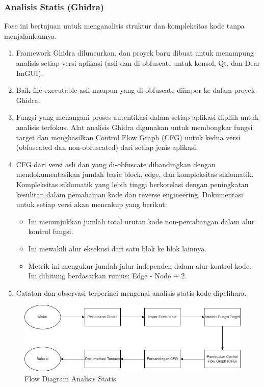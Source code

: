 \subsubsection{Analisis Statis (Ghidra)}
Fase ini bertujuan untuk menganalisis struktur dan kompleksitas kode tanpa menjalankannya.
\begin{enumerate}
	\item {} Framework Ghidra diluncurkan, dan proyek baru dibuat untuk menampung analisis setiap versi aplikasi (asli dan di-obfuscate untuk konsol, Qt, dan Dear ImGUI).
	\item {} Baik file executable asli maupun yang di-obfuscate diimpor ke dalam proyek Ghidra.
	\item {} Fungsi yang menangani proses autentikasi dalam setiap aplikasi dipilih untuk analisis terfokus. Alat analisis Ghidra digunakan untuk membongkar fungsi target dan menghasilkan Control Flow Graph (CFG) untuk kedua versi (obfuscated dan non-obfuscated) dari setiap jenis aplikasi.
	\item {} CFG dari versi asli dan yang di-obfuscate dibandingkan dengan mendokumentasikan jumlah basic block, edge, dan kompleksitas siklomatik. Kompleksitas siklomatik yang lebih tinggi berkorelasi dengan peningkatan kesulitan dalam pemahaman kode dan reverse engineering. Dokumentasi untuk setiap versi akan mencakup yang berikut:
	      \begin{itemize}
		      \item {} Ini menunjukkan jumlah total urutan kode non-percabangan dalam alur kontrol fungsi.
		      \item {} Ini mewakili alur eksekusi dari satu blok ke blok lainnya.
		      \item {} Metrik ini mengukur jumlah jalur independen dalam alur kontrol kode. Ini dihitung berdasarkan rumus: Edge - Node + 2
	      \end{itemize}
	\item {} Catatan dan observasi terperinci mengenai analisis statis kode dipelihara.
\end{enumerate}

\begin{figure}
	\centering
	\includegraphics[width=1\textwidth]
	{assets/pics/Static.png}
	\caption{Flow Diagram Analisis Statis}
\end{figure}

